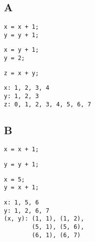 \section{}
\subsection{A}
\begin{minipage}[t]{.33\textwidth}
    \begin{lstlisting}[caption=Thread 1]
x = x + 1;
y = y + 1;
    \end{lstlisting}
\end{minipage}
\begin{minipage}[t]{.33\textwidth}
    \begin{lstlisting}[caption=Thread 2]
x = y + 1;
y = 2;
    \end{lstlisting}
\end{minipage}
\begin{minipage}[t]{.33\textwidth}
    \begin{lstlisting}[caption=Thread 3]
z = x + y;
    \end{lstlisting}
\end{minipage}

\begin{lstlisting}
x: 1, 2, 3, 4
y: 1, 2, 3
z: 0, 1, 2, 3, 4, 5, 6, 7
\end{lstlisting}

\subsection{B}
\begin{minipage}[t]{.33\textwidth}
    \begin{lstlisting}[caption=Thread 1]
x = x + 1;
    \end{lstlisting}
\end{minipage}
\begin{minipage}[t]{.33\textwidth}
    \begin{lstlisting}[caption=Thread 2]
y = y + 1;
    \end{lstlisting}
\end{minipage}
\begin{minipage}[t]{.33\textwidth}
    \begin{lstlisting}[caption=Thread 3]
x = 5;
y = x + 1;
    \end{lstlisting}
\end{minipage}

\begin{lstlisting}
x: 1, 5, 6
y: 1, 2, 6, 7
(x, y): (1, 1), (1, 2),
        (5, 1), (5, 6),
        (6, 1), (6, 7)
\end{lstlisting}